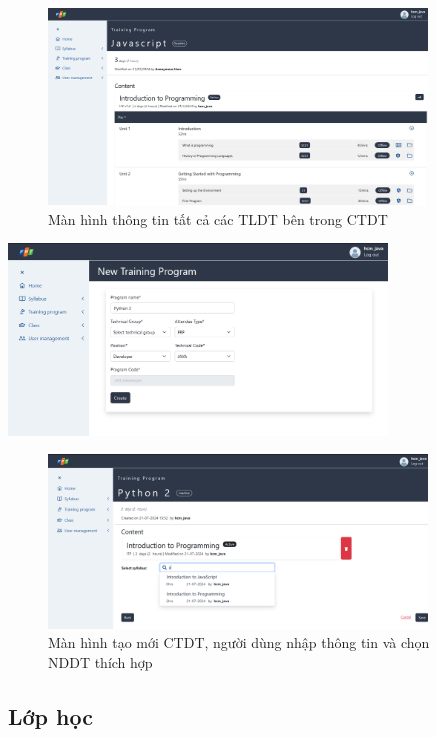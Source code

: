 \documentclass[report.tex]{subfiles}
\begin{document}
\begin{figure}[!htb]
{\centering
\includegraphics[width=380px]{../meta/ui.program-detail.png}
\caption[Màn hình thông tin CTDT]{Màn hình thông tin tất cả các TLDT bên trong CTDT}
\par
}
\end{figure}
\FloatBarrier

{\centering
\includegraphics[width=380px]{../meta/ui.program-create-1.png}
\par
}
\begin{figure}[!htb]
{\centering
\includegraphics[width=380px]{../meta/ui.program-create-2.png}
\caption[Màn hình tạo mới CTDT]{Màn hình tạo mới CTDT, người dùng nhập thông tin và chọn NDDT thích hợp}
\par
}
\end{figure}
\FloatBarrier

\subsection{Lớp học}
\end{document}
